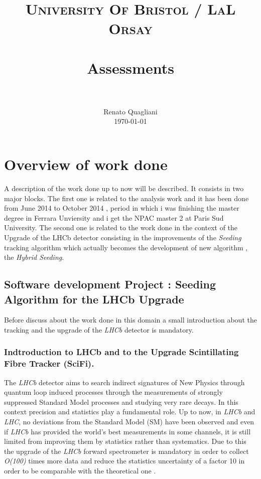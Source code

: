 \documentclass[paper=a4, fontsize=10pt]{scrartcl}
\title{
		\usefont{OT1}{bch}{b}{n}
		\normalfont \normalsize \textsc{University Of Bristol / LaL Orsay} \\ [25pt]
		\horrule{0.5pt} \\[0.4cm]
		\huge Assessments \\
		\horrule{2pt} \\[0.5cm]
}
\author{
		\normalfont 								\normalsize
        Renato Quagliani\\[-3pt]		\normalsize
        \today
}
\date{}
\numberwithin{equation}{section}		%
\numberwithin{figure}{section}			%
\numberwithin{table}{section}				%
\begin{document}
\maketitle
\section{Overview of work done}
A description of the work done up to now will be described. It consists in two major blocks. The first one is related to the analysis work and it has been done from June 2014 to October 2014 , period in which i was finishing the master degree in Ferrara Unviersity and i get the NPAC master 2 at Paris Sud University. The second one is related to the work done in the context of the Upgrade of the LHCb detector consisting in the improvements of the \textit{Seeding} tracking algorithm which actually becomes the development of new algorithm , the \textit{Hybrid Seeding}.
\subsection{Software development Project : Seeding Algorithm for the LHCb Upgrade}
Before discuss about the work done in this domain a small introduction about the tracking and the upgrade of the \textit{LHCb} detector is mandatory.
\subsubsection{Indtroduction to LHCb and to the Upgrade Scintillating Fibre Tracker (SciFi).}
The \textit{LHCb} detector \cite{Blake1} aims to search indirect signatures of New Physics through quantum loop induced processes through the measurements of strongly suppressed Standard Model processes and studying very rare decays. In this context precision and statistics play a fundamental role. Up to now, in \textit{LHCb} and \textit{LHC}, no deviations from the Standard Model (SM) have been observed and even if \textit{LHCb} has provided the world's best measurements in some channels, it is still limited from improving them by statistics rather than systematics. Due to this the upgrade of the \textit{LHCb} forward spectrometer is mandatory in order to collect \textit{O(100)} times more data and reduce the statistics uncertainty of a factor 10 in order to be comparable with the theoretical one \cite{Blake2}\cite{Blake3}.
\end{document}
